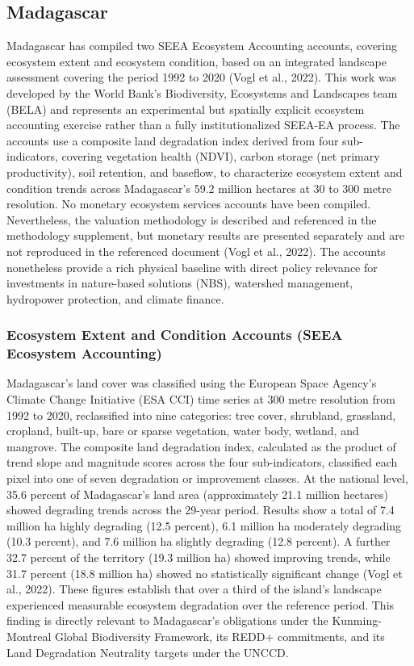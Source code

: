 \documentclass[
  letterpaper,
  DIV=11,
  numbers=noendperiod]{scrartcl}
\newcounter{none} %
\begin{document}
\subsection{Madagascar}\label{madagascar}

Madagascar has compiled two SEEA Ecosystem Accounting accounts, covering
ecosystem extent and ecosystem condition, based on an integrated
landscape assessment covering the period 1992 to 2020 (Vogl et al.,
2022). This work was developed by the World Bank's Biodiversity,
Ecosystems and Landscapes team (BELA) and represents an experimental but
spatially explicit ecosystem accounting exercise rather than a fully
institutionalized SEEA-EA process. The accounts use a composite land
degradation index derived from four sub-indicators, covering vegetation
health (NDVI), carbon storage (net primary productivity), soil
retention, and baseflow, to characterize ecosystem extent and condition
trends across Madagascar's 59.2 million hectares at 30 to 300 metre
resolution. No monetary ecosystem services accounts have been compiled.
Nevertheless, the valuation methodology is described and referenced in
the methodology supplement, but monetary results are presented
separately and are not reproduced in the referenced document (Vogl et
al., 2022). The accounts nonetheless provide a rich physical baseline
with direct policy relevance for investments in nature-based solutions
(NBS), watershed management, hydropower protection, and climate finance.

\subsubsection{Ecosystem Extent and Condition Accounts (SEEA Ecosystem
Accounting)}\label{ecosystem-extent-and-condition-accounts-seea-ecosystem-accounting-1}

Madagascar's land cover was classified using the European Space Agency's
Climate Change Initiative (ESA CCI) time series at 300 metre resolution
from 1992 to 2020, reclassified into nine categories: tree cover,
shrubland, grassland, cropland, built-up, bare or sparse vegetation,
water body, wetland, and mangrove. The composite land degradation index,
calculated as the product of trend slope and magnitude scores across the
four sub-indicators, classified each pixel into one of seven degradation
or improvement classes. At the national level, 35.6 percent of
Madagascar's land area (approximately 21.1 million hectares) showed
degrading trends across the 29-year period. Results show a total of 7.4
million ha highly degrading (12.5 percent), 6.1 million ha moderately
degrading (10.3 percent), and 7.6 million ha slightly degrading (12.8
percent). A further 32.7 percent of the territory (19.3 million ha)
showed improving trends, while 31.7 percent (18.8 million ha) showed no
statistically significant change (Vogl et al., 2022). These figures
establish that over a third of the island's landscape experienced
measurable ecosystem degradation over the reference period. This finding
is directly relevant to Madagascar's obligations under the
Kunming-Montreal Global Biodiversity Framework, its REDD+ commitments,
and its Land Degradation Neutrality targets under the UNCCD.
\end{document}
